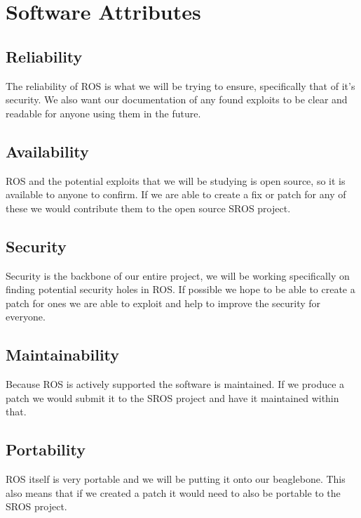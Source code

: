 \documentclass{scrreprt}
\begin{document}
\section{Software Attributes}
  \subsection{Reliability}
  The reliability of ROS is what we will be trying to ensure, specifically that of it's security.
  We also want our documentation of any found exploits to be clear and readable for anyone using them in the future.

  \subsection{Availability}
  ROS and the potential exploits that we will be studying is open source, so it is available to anyone to confirm.
  If we are able to create a fix or patch for any of these we would contribute them to the open source SROS project.

  \subsection{Security}
  Security is the backbone of our entire project, we will be working specifically on finding potential security holes in ROS.
  If possible we hope to be able to create a patch for ones we are able to exploit and help to improve the security for everyone.

  \subsection{Maintainability}
  Because ROS is actively supported the software is maintained.
  If we produce a patch we would submit it to the SROS project and have it maintained within that.

  \subsection{Portability}
  ROS itself is very portable and we will be putting it onto our beaglebone.
  This also means that if we created a patch it would need to also be portable to the SROS project.
\end{document}
